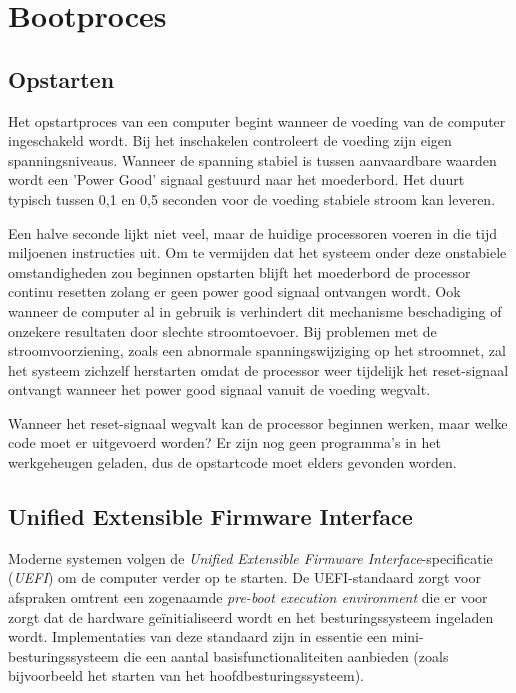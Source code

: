 \chapter{Bootproces}

\section{Opstarten}

Het opstartproces van een computer begint wanneer de voeding van
de computer ingeschakeld wordt. Bij het inschakelen controleert de
voeding zijn eigen spanningsniveaus. Wanneer de spanning stabiel is
tussen aanvaardbare waarden wordt een 'Power Good' signaal
gestuurd naar het moederbord. Het duurt typisch tussen 0,1 en 0,5
seconden voor de voeding stabiele stroom kan leveren.

Een halve seconde lijkt niet veel, maar de huidige processoren
voeren in die tijd miljoenen instructies uit. Om te vermijden dat het
systeem onder deze onstabiele omstandigheden zou beginnen opstarten
blijft het moederbord de processor continu resetten zolang er geen power
good signaal ontvangen wordt. Ook wanneer de computer al in gebruik is
verhindert dit mechanisme beschadiging of onzekere resultaten door
slechte stroomtoevoer. Bij problemen met de stroomvoorziening, zoals een
abnormale spanningswijziging op het stroomnet, zal het systeem zichzelf
herstarten omdat de processor weer tijdelijk het reset-signaal ontvangt
wanneer het power good signaal vanuit de voeding wegvalt.

Wanneer het reset-signaal wegvalt kan de processor beginnen
werken, maar welke code moet er uitgevoerd worden? Er zijn nog geen
programma's in het werkgeheugen geladen, dus de opstartcode moet elders
gevonden worden.

\section{Unified Extensible Firmware Interface}

Moderne systemen volgen de \emph{Unified Extensible Firmware Interface}-specificatie
(\emph{UEFI}) om de computer verder op te starten. De UEFI-standaard zorgt voor afspraken omtrent een zogenaamde
\emph{pre-boot execution environment} die er voor zorgt dat de hardware ge\"initialiseerd
wordt en het besturingssysteem ingeladen wordt. Implementaties van deze standaard zijn in essentie een 
mini-besturingssysteem die een aantal basisfunctionaliteiten aanbieden (zoals bijvoorbeeld
het starten van het hoofdbesturingssysteem).

